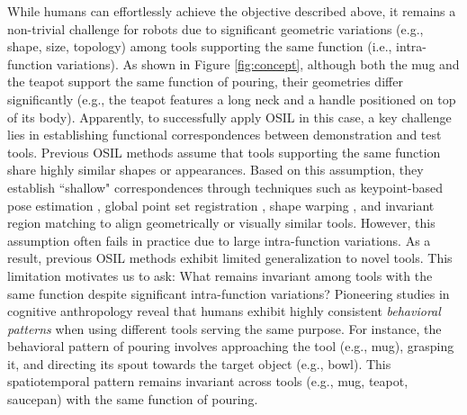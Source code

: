 While humans can effortlessly achieve the objective described above, it remains a non-trivial challenge for robots due to significant geometric variations (e.g., shape, size, topology) among tools supporting the same function (i.e., intra-function variations). 
As shown in Figure \ref{fig:concept}, although both the mug and the teapot support the same function of pouring,  their geometries differ significantly (e.g., the teapot features a long neck and a handle positioned on top of its body). 
Apparently, to successfully apply OSIL in this case, a key challenge lies in establishing functional correspondences between demonstration and test tools.
Previous OSIL methods \cite{vitiello2023one, heppert2024ditto, di2024dinobot, zhu2024vision, li2024okami, biza2023one, zhang2024one} assume that tools supporting the same function share highly similar shapes or appearances. 
Based on this assumption, they establish ``shallow" correspondences through techniques such as keypoint-based pose estimation \cite{vitiello2023one, heppert2024ditto, di2024dinobot}, global point set registration \cite{zhu2024vision, li2024okami}, shape warping \cite{biza2023one}, and invariant region matching \cite{zhang2024one} to align geometrically or visually similar tools. However, this assumption often fails in practice due to large intra-function variations.  
As a result, previous OSIL methods exhibit limited generalization to novel tools. This limitation motivates us to ask: What remains invariant among tools with the same function despite significant intra-function variations? Pioneering studies in cognitive anthropology \cite{washburn1960tools} reveal that humans exhibit highly consistent \textit{behavioral patterns} when using different tools serving the same purpose. For instance, the behavioral pattern of pouring involves approaching the tool (e.g., mug), grasping it, and directing its spout towards the target object (e.g., bowl). This spatiotemporal pattern remains invariant across tools (e.g., mug, teapot, saucepan) with the same function of pouring. 

